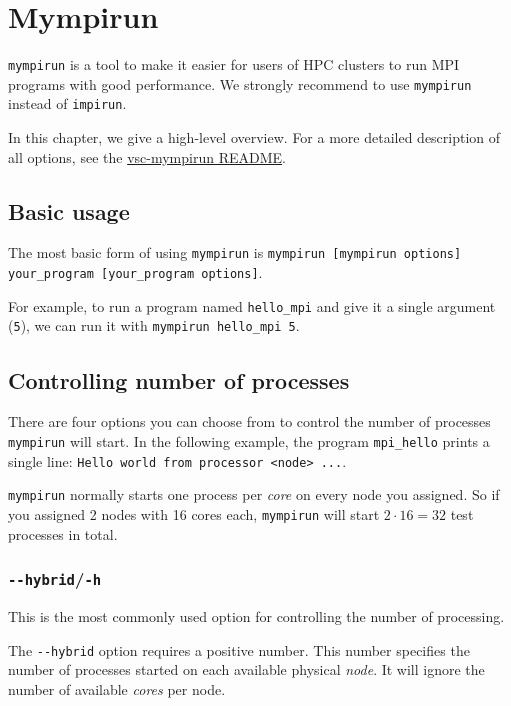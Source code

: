 \chapter{Mympirun}
\label{ch:mympirun}

\lstinline|mympirun| is a tool to make it easier for users of HPC clusters to run
MPI programs with good performance. We strongly recommend to use \lstinline|mympirun|
instead of \lstinline|impirun|.

In this chapter, we give a high-level overview. For a more detailed description of all
options, see the
\href{https://github.com/hpcugent/vsc-mympirun/blob/master/README.md}{vsc-mympirun README}.

\section{Basic usage}
\label{sec:myrun-basic-usage}

The most basic form of using \lstinline|mympirun| is \lstinline|mympirun [mympirun options] your_program [your_program options]|.

For example, to run a program named \lstinline|hello_mpi| and give it a single argument (\lstinline|5|),
we can run it with \lstinline|mympirun hello_mpi 5|.


\section{Controlling number of processes}

There are four options you can choose from to control the number of processes
\lstinline|mympirun| will start. In the following example, the program \lstinline|mpi_hello|
prints a single line: \lstinline|Hello world from processor <node> ...|.

\lstinline|mympirun| normally starts one process per \emph{core} on every node you assigned.
So if you assigned 2 nodes with 16 cores each, \lstinline|mympirun| will
start $2\cdot16=32$ test processes in total.

\subsection{\texttt{-{}-hybrid}/\texttt{-h}}

This is the most commonly used option for controlling the number of processing.

The \lstinline|--hybrid| option requires a positive number. This number specifies
the number of processes started on each available physical \emph{node}. It will ignore
the number of available \emph{cores} per node.

